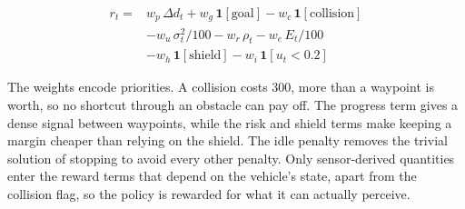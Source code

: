 \documentclass[conference]{IEEEtran}
\begin{document}
\begin{equation}\begin{split}r_t={}&w_p\,\Delta d_t+w_g\,\mathbf{1}[\mathrm{goal}]-w_c\,\mathbf{1}[\mathrm{collision}]\\&-w_u\,\sigma_t^{2}/100-w_r\,\rho_t-w_e\,E_t/100\\&-w_h\,\mathbf{1}[\mathrm{shield}]-w_i\,\mathbf{1}[u_t<0.2]\end{split}\end{equation}
\begin{table}[!t]\centering\caption{Reward Terms and Weights}\footnotesize{}\end{table}
The weights encode priorities. A collision costs 300, more than a waypoint is worth, so no shortcut through an obstacle can pay off. The progress term gives a dense signal between waypoints, while the risk and shield terms make keeping a margin cheaper than relying on the shield. The idle penalty removes the trivial solution of stopping to avoid every other penalty. Only sensor-derived quantities enter the reward terms that depend on the vehicle's state, apart from the collision flag, so the policy is rewarded for what it can actually perceive.
\end{document}
